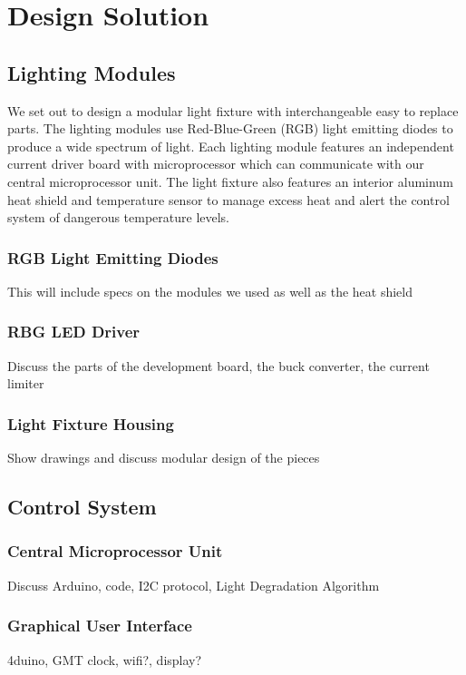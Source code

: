 \documentclass[12pt,a4paper]{report}
\begin{document}
\section{Design Solution}

\subsection{Lighting Modules}
We set out to design a modular light fixture with interchangeable easy to replace parts. The lighting modules use Red-Blue-Green (RGB) light emitting diodes to produce a wide spectrum of light. Each lighting module features an independent current driver board with microprocessor which can communicate with our central microprocessor unit. The light fixture also features an interior aluminum heat shield and temperature sensor to manage excess heat and alert the control system of dangerous temperature levels. 
 
\subsubsection{RGB Light Emitting Diodes}
This will include specs on the modules we used as well as the heat shield

\subsubsection{RBG LED Driver}
Discuss the parts of the development board, the buck converter, the current limiter

\subsubsection{Light Fixture Housing}
Show drawings and discuss modular design of the pieces

\subsection{Control System}
\blindtext
\subsubsection{Central Microprocessor Unit}
Discuss Arduino, code, I2C protocol, Light Degradation Algorithm

\subsubsection{Graphical User Interface}
4duino, GMT clock, wifi?, display?
\end{document}
